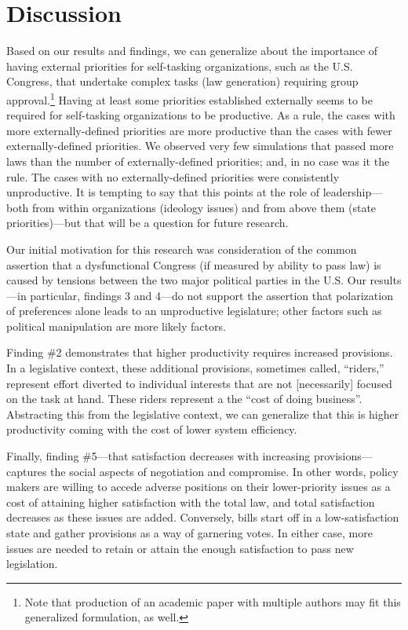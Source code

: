 \documentclass[pdftex,12pt,oribibl]{llncs}
\begin{document}
\section{Discussion}
%
Based on our results and findings, we can generalize about the importance of having external priorities for self-tasking organizations, such as the U.S. Congress, that undertake complex tasks (law generation) requiring group approval.\footnote{Note that production of an academic paper with multiple authors may fit this generalized formulation, as well.}
Having at least some priorities established externally seems to be required for self-tasking organizations to be productive. 
As a rule, the cases with more externally-defined priorities are more productive than the cases with fewer externally-defined priorities. 
We observed very few simulations that passed more laws than the number of externally-defined priorities; and, in no case was it the rule. 
The cases with no externally-defined priorities were consistently unproductive. 
It is tempting to say that this points at the role of leadership---both from within organizations (ideology issues) and from above them (state priorities)---but that will be a question for future research.

Our initial motivation for this research was consideration of the common assertion that a dysfunctional Congress (if measured by ability to pass law) is caused by tensions between the two major political parties in the U.S.
Our results---in particular, findings 3 and 4---do not support the assertion that polarization of preferences alone leads to an unproductive legislature; other factors such as political manipulation are more likely factors.

Finding \#2 demonstrates that higher productivity requires increased provisions.
In a legislative context, these additional provisions, sometimes called, ``riders,'' represent effort diverted to individual interests that are not [necessarily] focused on the task at hand.
These riders represent a the ``cost of doing business''.
Abstracting this from the legislative context, we can generalize that this is higher productivity coming with the cost of lower system efficiency.

Finally, finding \#5---that satisfaction decreases with increasing provisions---captures the social aspects of negotiation and compromise.  
In other words, policy makers are willing to accede adverse positions on their lower-priority issues as a cost of attaining higher satisfaction with the total law, and total satisfaction decreases as these issues are added. 
Conversely, bills start off in a low-satisfaction state and gather provisions as a way of garnering votes.  
In either case, more issues are needed to retain or attain the enough satisfaction to pass new legislation.
\end{document}
